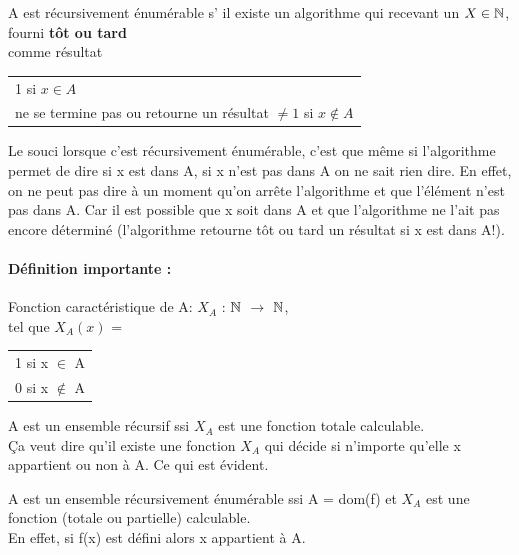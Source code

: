 \begin{mydef}
	A est récursivement énumérable s’ il existe un algorithme qui recevant
	un $X\in \mathbb{N}$, fourni \textbf{tôt ou tard} \\
	comme résultat
	\begin{tabular}{l}
		1 si $x\in A$\\
		 ne se termine pas ou retourne un résultat $\neq1$ si
		 $x\notin A$\\
	\end{tabular}
\end{mydef}

\begin{myrem}
	Le souci lorsque c'est récursivement énumérable,
	c'est que même si l'algorithme permet de dire si x est dans A, si x
	n'est pas dans A on ne sait rien dire. En effet, on ne peut pas dire à un moment qu'on
	arrête l'algorithme et que l'élément n'est pas dans A.
       	Car il est possible que x soit dans A et que l'algorithme ne
	l'ait pas encore déterminé (l'algorithme retourne tôt ou tard un
	résultat si x est dans A!).
\end{myrem}

\paragraph{Définition importante :}
\label{par:d_finition_importante}

\begin{mydef}
	Fonction caractéristique de A:
	$X_A$ : $\mathbb{N}$ $\rightarrow$ $\mathbb{N}$, \\
	tel que $X_A(x)$ =
	\begin{tabular}{l}
		1 si x $\in$ A \\	
		0 si x $\notin$ A 
	\end{tabular}
\end{mydef}

\begin{myprop}
	A est un ensemble récursif ssi $X_A$ est une fonction totale
	calculable. \\ 
	Ça veut dire qu'il existe une fonction $X_A$ qui décide si n'importe
	qu'elle x appartient ou non à A. Ce qui est évident.
\end{myprop}

\begin{myprop}
	A est un ensemble récursivement énumérable ssi A = dom(f) et $X_A$ est une 
	fonction (totale ou partielle) calculable.\\
       	En effet, si f(x) est défini alors
	x appartient à A.
\end{myprop}

